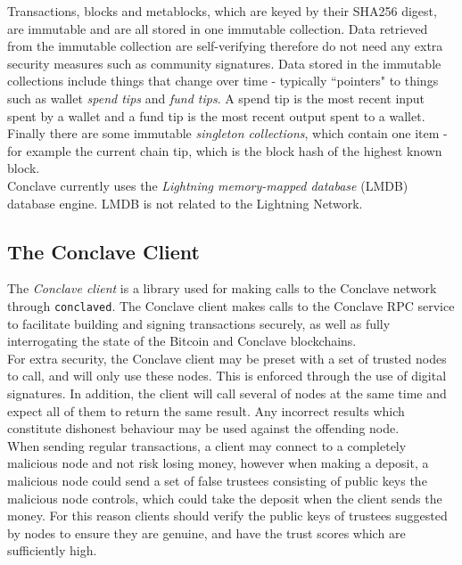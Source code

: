 \documentclass{report}
\begin{document}
			Transactions, blocks and metablocks, which are keyed by their SHA256 digest, are immutable and are all stored in one immutable collection. Data retrieved from the immutable collection are self-verifying therefore do not need any extra security measures such as community signatures. Data stored in the immutable collections include things that change over time - typically ``pointers" to things such as wallet \textit{spend tips} and \textit{fund tips}. A spend tip is the most recent input spent by a wallet and a fund tip is the most recent output spent to a wallet. Finally there are some immutable \textit{singleton collections}, which contain one item - for example the current chain tip, which is the block hash of the highest known block. \\
			
			Conclave currently uses the \textit{Lightning memory-mapped database} (LMDB) \cite{lmdb}  database engine. LMDB is not related to the Lightning Network.
			
		\subsection{The Conclave Client}
		
		The \textit{Conclave client} is a library used for making calls to the Conclave network through \texttt{conclaved}. The Conclave client makes calls to the Conclave RPC service to facilitate building and signing transactions securely, as well as fully interrogating the state of the Bitcoin and Conclave blockchains. \\
		
		For extra security, the Conclave client may be preset with a set of trusted nodes to call, and will only use these nodes. This is enforced through the use of digital signatures. In addition, the client will call several of nodes at the same time and expect all of them to return the same result. Any incorrect results which constitute dishonest behaviour may be used against the offending node. \\
		
		When sending regular transactions, a client may connect to a completely malicious node and not risk losing money, however when making a deposit, a malicious node could send a set of false trustees consisting of public keys the malicious node controls, which could take the deposit when the client sends the money. For this reason clients should verify the public keys of trustees suggested by nodes to ensure they are genuine, and have the trust scores which are sufficiently high.
\end{document}
